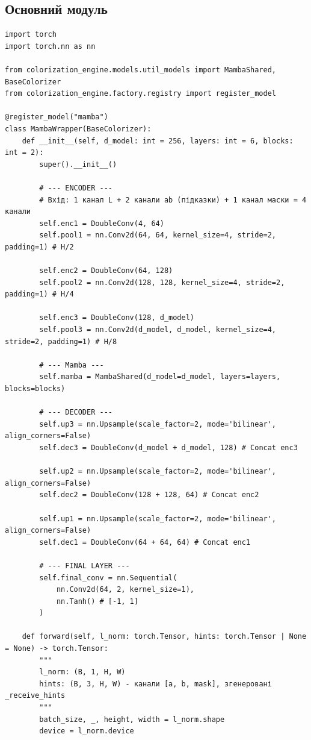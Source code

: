 \subsection{Основний модуль}
\begin{lstlisting}[caption={Клас модуля MambaWrapper (PyTorch)}]
import torch
import torch.nn as nn

from colorization_engine.models.util_models import MambaShared, BaseColorizer
from colorization_engine.factory.registry import register_model

@register_model("mamba")
class MambaWrapper(BaseColorizer):
    def __init__(self, d_model: int = 256, layers: int = 6, blocks: int = 2):
        super().__init__()
        
        # --- ENCODER ---
        # Вхід: 1 канал L + 2 канали ab (підказки) + 1 канал маски = 4 канали
        self.enc1 = DoubleConv(4, 64) 
        self.pool1 = nn.Conv2d(64, 64, kernel_size=4, stride=2, padding=1) # H/2

        self.enc2 = DoubleConv(64, 128)
        self.pool2 = nn.Conv2d(128, 128, kernel_size=4, stride=2, padding=1) # H/4
        
        self.enc3 = DoubleConv(128, d_model)
        self.pool3 = nn.Conv2d(d_model, d_model, kernel_size=4, stride=2, padding=1) # H/8

        # --- Mamba ---
        self.mamba = MambaShared(d_model=d_model, layers=layers, blocks=blocks)

        # --- DECODER ---
        self.up3 = nn.Upsample(scale_factor=2, mode='bilinear', align_corners=False)
        self.dec3 = DoubleConv(d_model + d_model, 128) # Concat enc3

        self.up2 = nn.Upsample(scale_factor=2, mode='bilinear', align_corners=False)
        self.dec2 = DoubleConv(128 + 128, 64) # Concat enc2

        self.up1 = nn.Upsample(scale_factor=2, mode='bilinear', align_corners=False)
        self.dec1 = DoubleConv(64 + 64, 64) # Concat enc1

        # --- FINAL LAYER ---
        self.final_conv = nn.Sequential(
            nn.Conv2d(64, 2, kernel_size=1),
            nn.Tanh() # [-1, 1]
        )

    def forward(self, l_norm: torch.Tensor, hints: torch.Tensor | None = None) -> torch.Tensor:
        """
        l_norm: (B, 1, H, W) 
        hints: (B, 3, H, W) - канали [a, b, mask], згенеровані _receive_hints
        """
        batch_size, _, height, width = l_norm.shape
        device = l_norm.device


\end{lstlisting}
